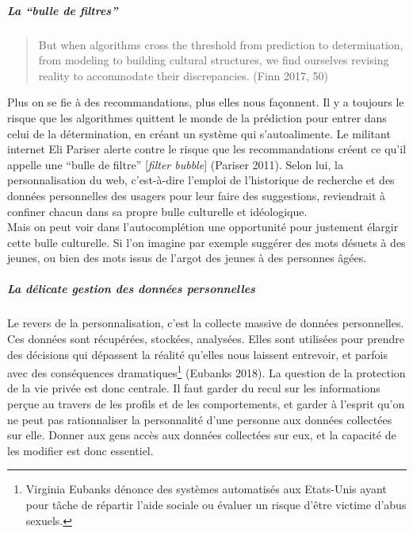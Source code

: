 \documentclass[]{article}
\let\oldsubparagraph\subparagraph
\renewcommand{\subparagraph}[1]{\oldsubparagraph{#1}\mbox{}}
\begin{document}
\hypertarget{la-bulle-de-filtres}{%
\subparagraph{La ``bulle de filtres''}\label{la-bulle-de-filtres}}

\begin{quote}
But when algorithms cross the threshold from prediction to
determination, from modeling to building cultural structures, we find
ourselves revising reality to accommodate their discrepancies. (Finn
2017, 50)
\end{quote}

Plus on se fie à des recommandations, plus elles nous façonnent. Il y a
toujours le risque que les algorithmes quittent le monde de la
prédiction pour entrer dans celui de la détermination, en créant un
système qui s'autoalimente. Le militant internet Eli Pariser alerte
contre le risque que les recommandations créent ce qu'il appelle une
``bulle de filtre'' {[}\emph{filter bubble}{]} (Pariser 2011). Selon
lui, la personnalisation du web, c'est-à-dire l'emploi de l'historique
de recherche et des données personnelles des usagers pour leur faire des
suggestions, reviendrait à confiner chacun dans sa propre bulle
culturelle et idéologique.\\
Mais on peut voir dans l'autocomplétion une opportunité pour justement
élargir cette bulle culturelle. Si l'on imagine par exemple suggérer des
mots désuets à des jeunes, ou bien des mots issus de l'argot des jeunes
à des personnes âgées.

\hypertarget{la-duxe9licate-gestion-des-donnuxe9es-personnelles}{%
\subparagraph{La délicate gestion des données
personnelles}\label{la-duxe9licate-gestion-des-donnuxe9es-personnelles}}

Le revers de la personnalisation, c'est la collecte massive de données
personnelles. Ces données sont récupérées, stockées, analysées. Elles
sont utilisées pour prendre des décisions qui dépassent la réalité
qu'elles nous laissent entrevoir, et parfois avec des conséquences
dramatiques\footnote{Virginia Eubanks dénonce des systèmes automatisés
  aux Etats-Unis ayant pour tâche de répartir l'aide sociale ou évaluer
  un risque d'être victime d'abus sexuels.} (Eubanks 2018). La question
de la protection de la vie privée est donc centrale. Il faut garder du
recul sur les informations perçue au travers de les profils et de les
comportements, et garder à l'esprit qu'on ne peut pas rationnaliser la
personnalité d'une personne aux données collectées sur elle. Donner aux
gens accès aux données collectées sur eux, et la capacité de les
modifier est donc essentiel.
\end{document}

